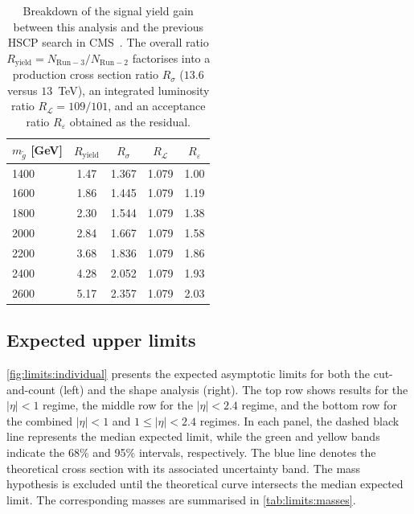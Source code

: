 \clearpage

\begin{table}[h!]
  \centering
  \begin{tabular}{lcccc}
    \toprule
    $m_{\tilde{g}}$ [GeV] & $R_{\text{yield}}$ & $R_{\sigma}$ & $R_{\mathcal{L}}$ & $R_{\varepsilon}$ \\
    \midrule
    1400 & 1.47 & 1.367 & 1.079 & 1.00 \\
    1600 & 1.86 & 1.445 & 1.079 & 1.19 \\
    1800 & 2.30 & 1.544 & 1.079 & 1.38 \\
    2000 & 2.84 & 1.667 & 1.079 & 1.58 \\
    2200 & 3.68 & 1.836 & 1.079 & 1.86 \\
    2400 & 4.28 & 2.052 & 1.079 & 1.93 \\
    2600 & 5.17 & 2.357 & 1.079 & 2.03 \\
    \bottomrule
  \end{tabular}
  \caption{Breakdown of the signal yield gain between this analysis and the previous HSCP search in CMS~\cite{HSCP_Run2}. The overall ratio $R_{\text{yield}} = N_{\mathrm{Run-3}}/N_{\mathrm{Run-2}}$ factorises into a production cross section ratio $R_{\sigma}$ ($13.6$ versus $13$~TeV), an integrated luminosity ratio $R_{\mathcal{L}} = 109/101$, and an acceptance ratio $R_{\varepsilon}$ obtained as the residual.}
  \label{tab:gain-decomposition}
\end{table}


\subsection{Expected upper limits}
\label{sec:limits:results}

\cref{fig:limits:individual} presents the expected asymptotic limits for both the cut-and-count (left) and the shape analysis (right). The top row shows results for the $|\eta|<1$ regime, the middle row for the $|\eta|<2.4$ regime, and the bottom row for the combined $|\eta|<1$ and $1\leq|\eta|<2.4$ regimes. In each panel, the dashed black line represents the median expected limit, while the green and yellow bands indicate the 68\% and 95\% intervals, respectively. The blue line denotes the theoretical cross section with its associated uncertainty band. The mass hypothesis is excluded until the theoretical curve intersects the median expected limit. The corresponding masses are summarised in \cref{tab:limits:masses}.

\vspace{0.5 cm}


